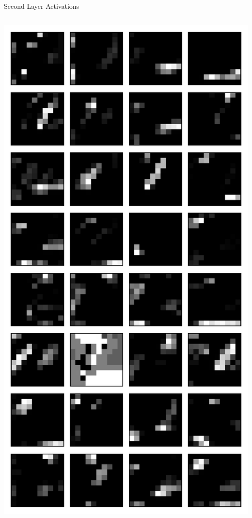 \documentclass[10pt, aspectratio=169]{beamer} %
\begin{document}
\begin{frame}[fragile]{Second Layer Activations}
\begin{columns}
\includegraphics[width=\textwidth]{keras_l2_outputs_2.pdf}
\end{columns}
\end{frame}
\end{document}
